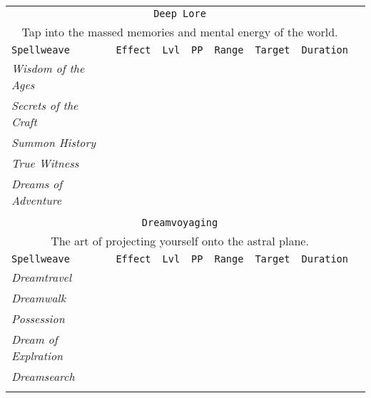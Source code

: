 \documentclass[10pt,a4paper]{article}
\begin{document}
\begin{table}[htbp!]
\begin{tabular}{llllllll}
 \multicolumn{7}{c}{\texttt{Deep Lore}}\\
  \multicolumn{7}{c}{Tap into the massed memories and mental energy of the world.}\\
    \hline
 \texttt{Spellweave} & \texttt{Effect} & \texttt{Lvl} & \texttt{PP} & \texttt{Range} & \texttt{Target} & \texttt{Duration} \\
    \hline
    \multirow{1}{*}{\textit{Wisdom of the Ages}}&  & &&  &  & \\
    \hline
    \multirow{1}{*}{\textit{Secrets of the Craft}}&  & &&  &  & \\
    \hline
    \multirow{1}{*}{\textit{Summon History}}&  & &&  &  & \\
    \hline
    \multirow{1}{*}{\textit{True Witness}}&  & &&  &  & \\
    \hline
    \multirow{1}{*}{\textit{Dreams of Adventure}}&  & &&  &  & \\
	&&&&&&\\
	
	
	
   \multicolumn{7}{c}{\texttt{Dreamvoyaging}}\\
  \multicolumn{7}{c}{The art of projecting yourself onto the astral plane.}\\
    \hline
 \texttt{Spellweave} & \texttt{Effect} & \texttt{Lvl} & \texttt{PP} & \texttt{Range} & \texttt{Target} & \texttt{Duration} \\
    \hline
    \multirow{1}{*}{\textit{Dreamtravel}}&  & &&  &  & \\
    \hline
    \multirow{1}{*}{\textit{Dreamwalk}}&  & &&  &  & \\
    \hline
    \multirow{1}{*}{\textit{Possession}}&  & &&  &  & \\
    \hline
    \multirow{1}{*}{\textit{Dream of Explration}}&  & &&  &  & \\
    \hline
    \multirow{1}{*}{\textit{Dreamsearch}}&  & &&  &  & \\
	&&&&&&\\	
	
\end{tabular}
\end{table} 
\end{document}
